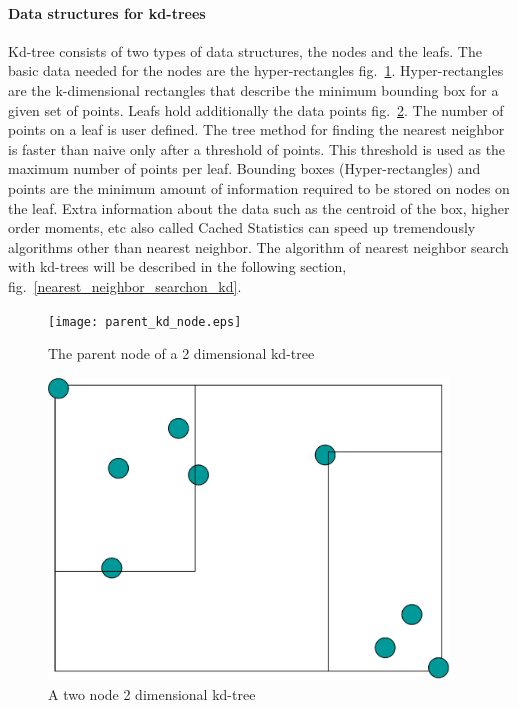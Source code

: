\documentclass[12pt,letterpaper,doublespaced,ETD,dvips,proposal]{gtthesis}
\begin{document}
\begin{Body}
\paragraph{Data structures for kd-trees}

 Kd-tree consists of two types of data structures, the nodes and the
 leafs. The basic data needed for the nodes are the
 hyper-rectangles fig.~\ref{parent_kd_node}. Hyper-rectangles are the k-dimensional rectangles that describe the minimum bounding box  for a given set of points.
 Leafs hold additionally the data points  fig.~\ref{2_kd_node}. The number of points on a
 leaf is user defined. The tree method for finding the nearest neighbor is faster than naive
 only after a threshold of points. This threshold is used as the maximum number of points
 per leaf. Bounding boxes (Hyper-rectangles) and points are the minimum amount
 of information required to be stored on nodes on the leaf. Extra
 information about the data such as the centroid of the box, higher
 order moments, etc also called Cached Statistics can speed up
 tremendously algorithms other than nearest neighbor. The algorithm
 of nearest neighbor search with kd-trees will be described  in the following section,
 fig.~\ref{nearest_neighbor_searchon_kd}.

\begin{figure}[!htb]
\label{parent_kd_node}
\centerline{\texttt{[image: parent\_kd\_node.eps]}}
\caption{The parent node of a 2
dimensional kd-tree}
\end{figure}


\begin{figure}[!htb]
\label{2_kd_node}
\centerline{\includegraphics[height=8cm]{2_kd_node.eps}}
\caption{A two node 2 dimensional
kd-tree}
\end{figure}


\end{Body}
\end{document}
